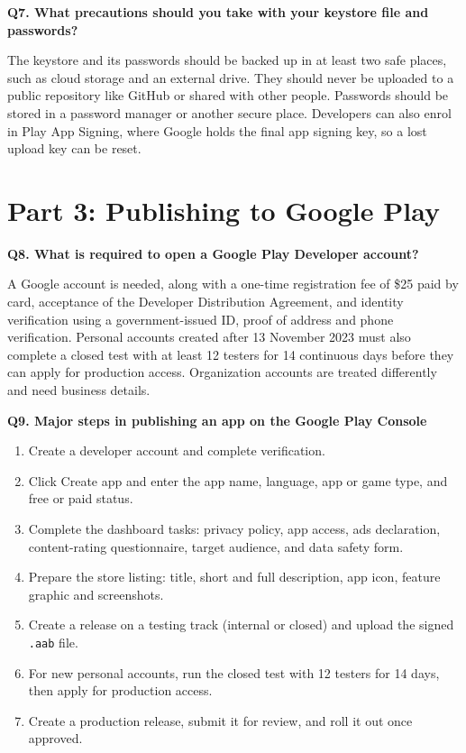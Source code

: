 \documentclass[11pt,letterpaper]{article}
\newcommand{\question}[1]{%
  \Needspace{5\baselineskip}%
  \vspace{6pt}\noindent\textbf{#1}\par\nopagebreak}
\begin{document}
\question{Q7. What precautions should you take with your keystore file and passwords?}
The keystore and its passwords should be backed up in at least two safe places,
such as cloud storage and an external drive. They should never be uploaded to a
public repository like GitHub or shared with other people. Passwords should be
stored in a password manager or another secure place. Developers can also enrol in
Play App Signing, where Google holds the final app signing key, so a lost upload
key can be reset.

\section{Part 3: Publishing to Google Play}

\question{Q8. What is required to open a Google Play Developer account?}
A Google account is needed, along with a one-time registration fee of \$25 paid by
card, acceptance of the Developer Distribution Agreement, and identity verification
using a government-issued ID, proof of address and phone verification. Personal
accounts created after 13 November 2023 must also complete a closed test with at
least 12 testers for 14 continuous days before they can apply for production
access. Organization accounts are treated differently and need business details.

\question{Q9. Major steps in publishing an app on the Google Play Console}
\begin{enumerate}[leftmargin=2em,itemsep=2pt]
  \item Create a developer account and complete verification.
  \item Click Create app and enter the app name, language, app or game type, and
        free or paid status.
  \item Complete the dashboard tasks: privacy policy, app access, ads declaration,
        content-rating questionnaire, target audience, and data safety form.
  \item Prepare the store listing: title, short and full description, app icon,
        feature graphic and screenshots.
  \item Create a release on a testing track (internal or closed) and upload the
        signed \texttt{.aab} file.
  \item For new personal accounts, run the closed test with 12 testers for 14 days,
        then apply for production access.
  \item Create a production release, submit it for review, and roll it out once
        approved.
\end{enumerate}
\end{document}
